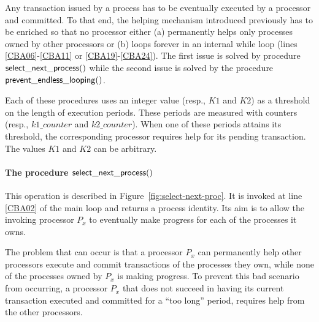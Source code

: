 Any transaction issued by a process has to be eventually executed 
by  a processor and  committed. 
To that end, the helping mechanism introduced previously has 
 to be enriched so that  no processor either (a) permanently helps  only
 processes owned by other processors or (b) loops forever in an internal 
while loop (lines \ref{CBA06}-\ref{CBA11} or \ref{CBA19}-\ref{CBA24}).
The first issue is solved by  procedure ${\sf select\_next\_process}()$
while the second issue is solved by the procedure 
${\sf prevent\_endless\_looping}()$.  

Each of these  procedures  uses an  integer value (resp., $K1$ and $K2$) 
as  a threshold  on the length of execution periods. These periods 
are measured with counters (resp., $k1\_counter$ and $k2\_counter$). 
When one of these periods attains its threshold, the corresponding 
processor requires help for its pending  transaction. 
The values $K1$ and $K2$ can be arbitrary. 


\paragraph{The procedure  ${\sf select\_next\_process}()$}
This operation is described in Figure~\ref{fig:select-next-proc}.
It is invoked at line \ref{CBA02} of the main loop and 
returns a process identity.  Its aim is to allow the invoking processor 
$P_x$  to  eventually make  progress for each of the processes it owns. 

The problem that can  occur is that a processor  $P_x$ 
can permanently help other processors execute and commit
transactions of the processes they own, while none of the processes 
owned by $P_x$ is  making progress.  To prevent this bad scenario  
from occurring, a  processor $P_x$ that does not  succeed in having  
its current transaction executed and committed for  a ``too long''
period,  requires help from the other processors. 






